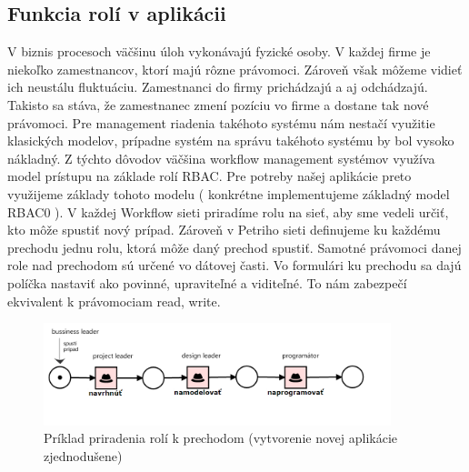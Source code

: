 

\subsection{Funkcia rolí v aplikácii}
V biznis procesoch väčšinu úloh vykonávajú fyzické osoby. V každej firme je niekoľko zamestnancov, ktorí majú rôzne právomoci. Zároveň však môžeme vidieť ich neustálu fluktuáciu. Zamestnanci do firmy prichádzajú a aj odchádzajú. Takisto sa stáva, že zamestnanec zmení pozíciu vo firme a dostane tak nové právomoci. Pre management riadenia takéhoto systému nám nestačí využitie klasických modelov, prípadne systém na správu takéhoto systému by bol vysoko nákladný. Z týchto dôvodov väčšina workflow management systémov využíva model  prístupu na základe rolí RBAC. Pre potreby našej aplikácie preto využijeme základy tohoto modelu ( konkrétne implementujeme základný model RBAC0 ). V každej Workflow sieti priradíme rolu na sieť, aby sme vedeli určiť, kto môže spustiť nový prípad. Zároveň v Petriho sieti definujeme ku každému prechodu jednu rolu, ktorá môže daný prechod spustiť. Samotné právomoci danej role nad prechodom sú určené vo dátovej časti. Vo formulári ku prechodu sa dajú políčka nastaviť ako povinné, upraviteľné a viditeľné. To nám zabezpečí ekvivalent k právomociam read, write. 

\begin{figure}[h]
	\centerline{\includegraphics[width=0.9\textwidth]{images/vyvoj_role}}
	\caption{Príklad priradenia rolí k prechodom (vytvorenie novej aplikácie zjednodušene)}
	\label{obr:role_na prechody}
\end{figure}



